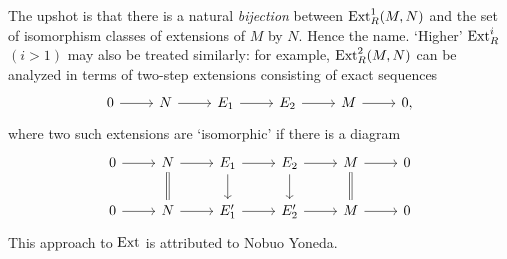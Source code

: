 \documentclass[../../master.tex]{subfiles}
\begin{document}
\begin{problem}
\begin{itemize}[leftmargin=*]
    \end{itemize}
    The upshot is that there is a natural \textit{bijection} between $\operatorname{Ext}_R^{1}(M, N)$ and the set of isomorphism classes of extensions of $M$ by $N$.
    Hence the name.
    `Higher' $\operatorname{Ext}_R^{i}$ $(i > 1)$ may also be treated similarly:
    for example, $\operatorname{Ext}_R^2(M, N)$ can be analyzed in terms of two-step extensions consisting of exact sequences
    \[
    \begin{tikzcd}
        0 & N & E_1 & E_2 & M & 0,
        \arrow[from=1-1, to=1-2]
        \arrow[from=1-2, to=1-3]
        \arrow[from=1-3, to=1-4]
        \arrow[from=1-4, to=1-5] 
        \arrow[from=1-5, to=1-6] 
    \end{tikzcd}
    \]
    where two such extensions are `isomorphic' if there is a diagram
    \[
    \begin{tikzcd}
        0 & N & E_1 & E_2 & M & 0 \\
        0 & N & E_1' & E_2' & M & 0
        \arrow[from=1-1, to=1-2]
        \arrow[from=1-2, to=1-3]
        \arrow[from=1-3, to=1-4]
        \arrow[from=1-4, to=1-5] 
        \arrow[from=1-5, to=1-6] 
        \arrow[from=2-1, to=2-2]
        \arrow[from=2-2, to=2-3]
        \arrow[from=2-3, to=2-4]
        \arrow[from=2-4, to=2-5] 
        \arrow[from=2-5, to=2-6] 
        \arrow[from=1-2, to=2-2, equals]
        \arrow[from=1-3, to=2-3]
        \arrow[from=1-4, to=2-4]
        \arrow[from=1-5, to=2-5, equals] 
    \end{tikzcd}
    \]
    This approach to $\operatorname{Ext}$ is attributed to Nobuo Yoneda.
\end{problem}
\end{document}

